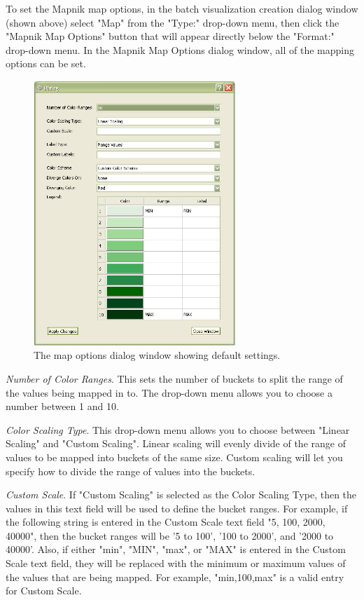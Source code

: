 To set the Mapnik map options, in the batch visualization creation 
dialog window (shown above) select "Map" from the "Type:" drop-down menu, 
then click the "Mapnik Map Options" button that will appear directly below the 
"Format:" drop-down menu. In the Mapnik Map Options dialog window, all 
of the mapping options can be set.

\begin{figure}[h]
\begin{center}
\includegraphics[width=3in]{part-gui/images/result-manager-mapnik-options-dialog.png}
\end{center}
\caption{The map options dialog window showing default settings.}
\label{fig:result-manager-mapnik-options-dialog}
\end{figure}

\emph{Number of Color Ranges}. This sets the number of 
buckets to split the range of the values 
being mapped in to. The drop-down menu allows you to choose a 
number between 1 and 10.

\emph{Color Scaling Type}. This drop-down menu 
allows you to choose between "Linear Scaling" 
and "Custom Scaling". Linear scaling will evenly divide of the 
range of values to be mapped into buckets of the same size.  
Custom scaling will let you specify how to divide the range of values 
into the buckets. 

\emph{Custom Scale}. If "Custom Scaling" is selected 
as the Color Scaling Type, then 
the values in this text field will be used to define the bucket 
ranges. For example, if the following string is entered in 
the Custom Scale text field "5, 100, 2000, 40000", then the bucket 
ranges will be '5 to 100', '100 to 2000', and '2000 to 40000'.  
Also, if either "min", "MIN", "max", or "MAX" is entered in the 
Custom Scale text field, they will be replaced with the minimum 
or maximum values of the values that are being mapped. For example, 
"min,100,max" is a valid entry for Custom Scale.

